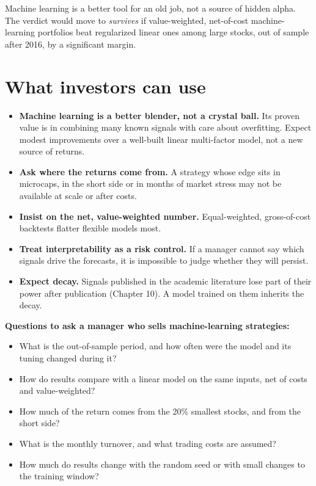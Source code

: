 Machine learning is a better tool for an old job, not a source of hidden alpha. The verdict would move to \emph{survives} if value-weighted, net-of-cost machine-learning portfolios beat regularized linear ones among large stocks, out of sample after 2016, by a significant margin.

\section{What investors can use}
\label{sec:21-investors}

\begin{itemize}
  \item \textbf{Machine learning is a better blender, not a crystal ball.} Its proven value is in combining many known signals with care about overfitting. Expect modest improvements over a well-built linear multi-factor model, not a new source of returns.
  \item \textbf{Ask where the returns come from.} A strategy whose edge sits in microcaps, in the short side or in months of market stress may not be available at scale or after costs.
  \item \textbf{Insist on the net, value-weighted number.} Equal-weighted, gross-of-cost backtests flatter flexible models most.
  \item \textbf{Treat interpretability as a risk control.} If a manager cannot say which signals drive the forecasts, it is impossible to judge whether they will persist.
  \item \textbf{Expect decay.} Signals published in the academic literature lose part of their power after publication (Chapter 10). A model trained on them inherits the decay.
\end{itemize}

\textbf{Questions to ask a manager who sells machine-learning strategies:}

\begin{itemize}
  \item What is the out-of-sample period, and how often were the model and its tuning changed during it?
  \item How do results compare with a linear model on the same inputs, net of costs and value-weighted?
  \item How much of the return comes from the 20\% smallest stocks, and from the short side?
  \item What is the monthly turnover, and what trading costs are assumed?
  \item How much do results change with the random seed or with small changes to the training window?
\end{itemize}

